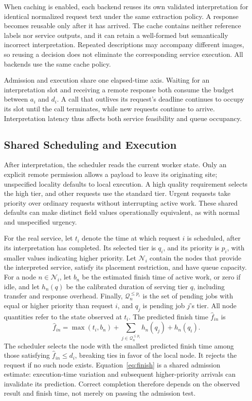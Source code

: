 When caching is enabled, each backend reuses its own validated interpretation
for identical normalized request text under the same extraction policy.
A response becomes reusable only after it has arrived. The cache contains
neither reference labels nor service outputs, and it can retain a
well-formed but semantically incorrect interpretation. Repeated descriptions
may accompany different images, so reusing a decision does not eliminate
the corresponding service execution. All backends use the same cache policy.

Admission and execution share one elapsed-time axis. Waiting for an
interpretation slot and receiving a remote response both consume the budget
between $a_i$ and $d_i$. A call that outlives its request's deadline continues
to occupy its slot until the call terminates, while new requests continue
to arrive. Interpretation latency thus affects both service feasibility
and queue occupancy.

\subsection{Shared Scheduling and Execution}
After interpretation, the scheduler reads the current worker state. Only an
explicit remote permission allows a payload to leave its originating site;
unspecified locality defaults to local execution. A high quality requirement
selects the high tier, and other requests use the standard tier. Urgent
requests take priority over ordinary requests without interrupting active
work. These shared defaults can make distinct field values operationally
equivalent, as with normal and unspecified urgency.

For the real service, let $t_i$ denote the time at which request $i$ is
scheduled, after its interpretation has completed. Its selected tier is
$q_i$, and its priority is $p_i$, with smaller values indicating higher
priority. Let $\mathcal{N}_i$ contain the nodes that provide the interpreted
service, satisfy its placement restriction, and have queue capacity.
For a node $n\in\mathcal{N}_i$, let $b_n$ be the estimated finish time of
active work, or zero if idle, and let $h_n(q)$ be the calibrated duration of
serving tier $q$, including transfer and response overhead. Finally,
$\mathcal{Q}_n^{\leq p_i}$ is the set of pending jobs with equal or higher
priority than request $i$, and $q_j$ is pending job $j$'s tier. All node
quantities refer to the state observed at $t_i$. The predicted finish time
$\widehat f_{in}$ is
\begin{equation}
\widehat f_{in}=\max(t_i,b_n)
  +\sum_{j\in\mathcal{Q}_n^{\leq p_i}}h_n(q_j)+h_n(q_i).
\label{eq:finish}
\end{equation}
The scheduler selects the node with the smallest predicted finish time among
those satisfying $\widehat f_{in}\leq d_i$, breaking ties in favor of the
local node. It rejects the request if no such node exists. Equation~\ref{eq:finish}
is a shared admission estimate: execution-time variation and subsequent
higher-priority arrivals can invalidate its prediction. Correct completion
therefore depends on the observed result and finish time, not merely on
passing the admission test.

